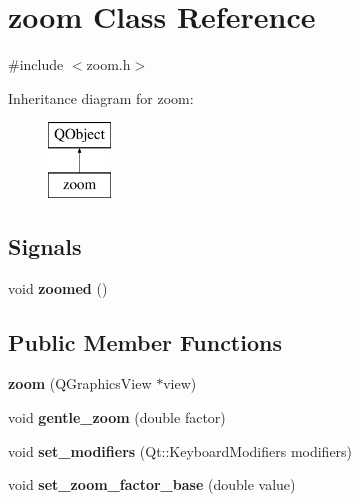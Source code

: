 \hypertarget{classzoom}{}\section{zoom Class Reference}
\label{classzoom}


{\ttfamily \#include $<$zoom.\+h$>$}

Inheritance diagram for zoom\+:\begin{figure}[H]
\begin{center}
\leavevmode
\includegraphics[height=2.000000cm]{classzoom}
\end{center}
\end{figure}
\subsection*{Signals}
\begin{DoxyCompactItemize}
\item 
\mbox{\label{classzoom_adb6956b53b9e64ca1ccb0f46cbe3a35f}} 
void {\bfseries zoomed} ()
\end{DoxyCompactItemize}
\subsection*{Public Member Functions}
\begin{DoxyCompactItemize}
\item 
\mbox{\label{classzoom_a07440bd0b04ea8cb0ebf4b7add046ebe}} 
{\bfseries zoom} (Q\+Graphics\+View $\ast$view)
\item 
\mbox{\label{classzoom_ac4d5419f79b8ffb9a51eaed182e9dd95}} 
void {\bfseries gentle\+\_\+zoom} (double factor)
\item 
\mbox{\label{classzoom_a9efd3e68e59ebbffddffbeeec316be82}} 
void {\bfseries set\+\_\+modifiers} (Qt\+::\+Keyboard\+Modifiers modifiers)
\item 
\mbox{\label{classzoom_a2de8b7b8b6803586d41ce1f7b3864b77}} 
void {\bfseries set\+\_\+zoom\+\_\+factor\+\_\+base} (double value)
\end{DoxyCompactItemize}


